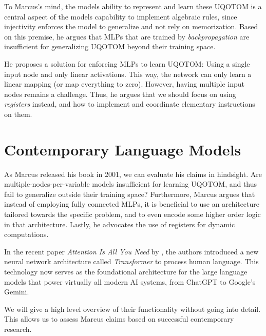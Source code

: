 \documentclass{article}
\theoremstyle{plain}
\theoremstyle{definition}
\begin{document}
To Marcus's mind, the models ability to represent and learn these UQOTOM is a central aspect of the models capability to implement algebraic rules, since injectivity enforces the model to generalize and not rely on memorization. Based on this premise, he argues that MLPs that are trained by \emph{backpropagation} are insufficient for generalizing UQOTOM beyond their training space.

He proposes a solution for enforcing MLPs to learn UQOTOM: Using a single input node and only linear activations. This way, the network can only learn a linear mapping (or map everything to zero). However, having multiple input nodes remains a challenge. Thus, he argues that we should focus on using \emph{registers} instead, and how to implement and coordinate elementary instructions on them.


\section*{Contemporary Language Models}
As Marcus released his book in 2001, we can evaluate his claims in hindsight. Are multiple-nodes-per-variable models insufficient for learning UQOTOM, and thus fail to generalize outside their training space? Furthermore, Marcus argues that instead of employing fully connected MLPs, it is beneficial to use an architecture tailored towards the specific problem, and to even encode some higher order logic in that architecture. Lastly, he advocates the use of registers for dynamic computations.

In the recent paper \emph{Attention Is All You Need} by \textcite{vaswani2017attention}, the authors introduced a new neural network architecture called \emph{Transformer} to process human language. This technology now serves as the foundational architecture for the large language models that power virtually all modern AI systems, from ChatGPT to Google's Gemini.

We will give a high level overview of their functionality without going into detail. This allows us to assess Marcus claims based on successful contemporary research.
\end{document}
